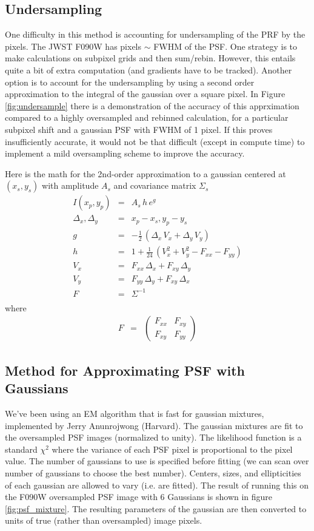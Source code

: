 \documentclass[modern]{aastex62}
\newcommand{\dx}{\Delta_x}
\newcommand{\dy}{\Delta_y}
\begin{document}
\subsection{Undersampling}
One difficulty in this method is accounting for undersampling of the PRF by the pixels.
The JWST F090W has pixels $\sim$ FWHM of the PSF.
One strategy is to make calculations on subpixel grids and then sum/rebin.
However, this entails quite a bit of extra computation (and gradients have to be tracked).
Another option is to account for the undersampling by using a second order approximation to the integral of the gaussian over a square pixel.
In Figure \ref{fig:undersample} there is a demonstration of the accuracy of this apprximation compared to a highly oversampled and rebinned calculation, for a particular subpixel shift and a gaussian PSF with FWHM of 1 pixel.
If this proves insufficiently accurate, it would not be that difficult (except in compute time) to implement a mild oversampling scheme to improve the accuracy.

Here is the math for the 2nd-order approximation to a gaussian centered at $(x_s, y_s)$ with amplitude $A_s$ and covariance matrix $\Sigma_s$
\begin{eqnarray}
I(x_p, y_p)   & = & A_s \, h \, e^{g } \\
\dx, \dy & = & x_p - x_s, y_p - y_s  \nonumber\\
g     & = & -\frac{1}{2} \, (\dx \, V_{x} + \dy \, V_y) \nonumber \\
h     & = & 1 + \frac{1}{24} \, (V_x^2 + V_y^2 - F_{xx} - F_{yy}) \nonumber \\
V_x  & = & F_{xx} \, \dx + F_{xy} \, \dy  \nonumber \\
V_y  & = & F_{yy} \, \dy + F_{xy} \, \dx \nonumber \\
F & = & \Sigma^{-1} \nonumber \\
\end{eqnarray}
where
\begin{eqnarray}
F  & = & \begin{pmatrix} F_{xx} & F_{xy} \\ F_{xy} & F_{yy} \end{pmatrix} \nonumber
\end{eqnarray}


\subsection{Method for Approximating PSF with Gaussians}
We've been using an EM algorithm that is fast for gaussian mixtures, implemented by Jerry Anunrojwong (Harvard). 
The gaussian mixtures are fit to the oversampled PSF images (normalized to unity).
The likelihood function is a standard $\chi^2$ where the variance of each PSF pixel is proportional to the pixel value.
The number of gaussians to use is specified before fitting (we can scan over number of gaussians to choose the best number).
Centers, sizes, and ellipticities of each gaussian are allowed to vary (i.e. are fitted).
The result of running this on the F090W oversampled PSF image with 6 Gaussians is shown in figure \ref{fig:psf_mixture}.
The resulting parameters of the gaussian are then converted to units of true (rather than oversampled) image pixels.
\end{document}
